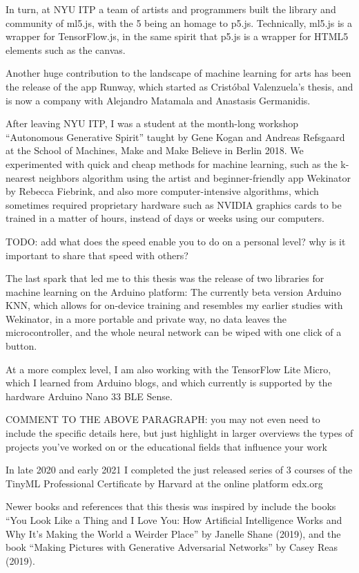 In turn, at NYU ITP a team of artists and programmers built the library and community of ml5.js, with the 5 being an homage to p5.js. Technically, ml5.js is a wrapper for TensorFlow.js, in the same spirit that p5.js is a wrapper for HTML5 elements such as the canvas.

Another huge contribution to the landscape of machine learning for arts has been the release of the app Runway, which started as Cristóbal Valenzuela’s thesis, and is now a company with Alejandro Matamala and Anastasis Germanidis.

After leaving NYU ITP, I was a student at the month-long workshop “Autonomous Generative Spirit” taught by Gene Kogan and Andreas Refsgaard at the School of Machines, Make and Make Believe in Berlin 2018. We experimented with quick and cheap methods for machine learning, such as the k-nearest neighbors algorithm using the artist and beginner-friendly app Wekinator by Rebecca Fiebrink, and also more computer-intensive algorithms, which sometimes required proprietary hardware such as NVIDIA graphics cards to be trained in a matter of hours, instead of days or weeks using our computers.

TODO: add what does the speed enable you to do on a personal level? why is it important to share that speed with others?

The last spark that led me to this thesis was the release of two libraries for machine learning on the Arduino platform: The currently beta version Arduino KNN, which allows for on-device training and resembles my earlier studies with Wekinator, in a more portable and private way, no data leaves the microcontroller, and the whole neural network can be wiped with one click of a button.

At a more complex level, I am also working with the TensorFlow Lite Micro, which I learned from Arduino blogs, and which currently is supported by the hardware Arduino Nano 33 BLE Sense.

COMMENT TO THE ABOVE PARAGRAPH: you may not even need to include the specific details here, but just highlight in larger overviews the types of projects you've worked on or the educational fields that influence your work

In late 2020 and early 2021 I completed the just released series of 3 courses of the TinyML Professional Certificate by Harvard at the online platform edx.org

Newer books and references that this thesis was inspired by include the books “You Look Like a Thing and I Love You: How Artificial Intelligence Works and Why It's Making the World a Weirder Place” by Janelle Shane (2019), and the book “Making Pictures with Generative Adversarial Networks” by Casey Reas (2019).

